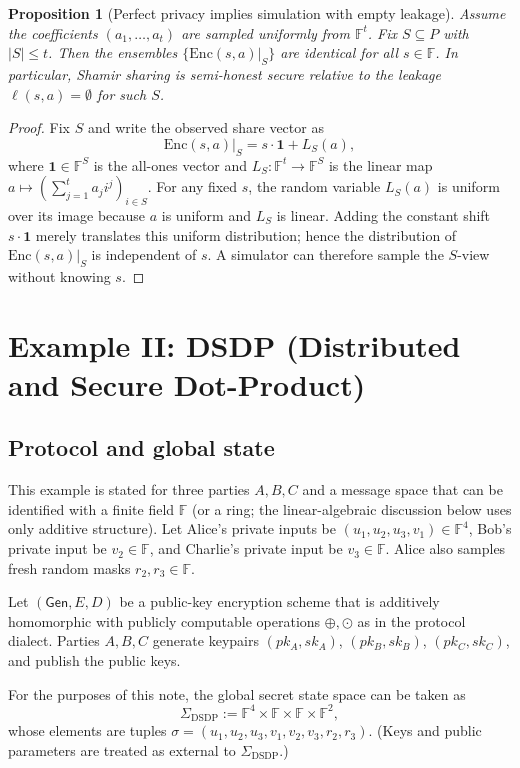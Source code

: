 \documentclass[11pt,a4paper]{article}
\newtheorem{proposition}[theorem]{Proposition}
\theoremstyle{definition}
\theoremstyle{remark}
\newcommand{\Parties}{P}
\newcommand{\F}{\mathbb{F}}
\newcommand{\Enc}{\mathrm{Enc}}
\newcommand{\headd}{\mathbin{\oplus}}
\newcommand{\hesmul}{\mathbin{\odot}}
\begin{document}
\begin{proposition}[Perfect privacy implies simulation with empty leakage]
\label{prop:shamir-perfect-privacy}
Assume the coefficients \((a_1,\dots,a_t)\) are sampled uniformly from \(\F^t\). Fix \(S\subseteq \Parties\) with \(|S|\le t\). Then the ensembles \(\{\Enc(s,a)\vert_S\}\) are identical for all \(s\in\F\). In particular, Shamir sharing is semi-honest secure relative to the leakage \(\ell(s,a)=\emptyset\) for such \(S\).
\end{proposition}

\begin{proof}
Fix \(S\) and write the observed share vector as
\[
\Enc(s,a)\vert_S = s\cdot \mathbf{1} + L_S(a),
\]
where \(\mathbf{1}\in\F^S\) is the all-ones vector and \(L_S:\F^t\to \F^S\) is the linear map \(a\mapsto ( \sum_{j=1}^t a_j i^j )_{i\in S}\). For any fixed \(s\), the random variable \(L_S(a)\) is uniform over its image because \(a\) is uniform and \(L_S\) is linear. Adding the constant shift \(s\cdot \mathbf{1}\) merely translates this uniform distribution; hence the distribution of \(\Enc(s,a)\vert_S\) is independent of \(s\). A simulator can therefore sample the \(S\)-view without knowing \(s\).
\end{proof}

\section{Example II: DSDP (Distributed and Secure Dot-Product)}
\label{sec:dsdp}

\subsection{Protocol and global state}
This example is stated for three parties \(A,B,C\) and a message space that can be identified with a finite field \(\F\) (or a ring; the linear-algebraic discussion below uses only additive structure). Let Alice's private inputs be \((u_1,u_2,u_3,v_1)\in \F^4\), Bob's private input be \(v_2\in\F\), and Charlie's private input be \(v_3\in\F\). Alice also samples fresh random masks \(r_2,r_3\in\F\).

Let \((\mathsf{Gen},E,D)\) be a public-key encryption scheme that is additively homomorphic with publicly computable operations \(\headd,\hesmul\) as in the protocol dialect. Parties \(A,B,C\) generate keypairs \((pk_A,sk_A)\), \((pk_B,sk_B)\), \((pk_C,sk_C)\), and publish the public keys.

For the purposes of this note, the global secret state space can be taken as
\[
\Sigma_{\mathrm{DSDP}} := \F^4 \times \F \times \F \times \F^2,
\]
whose elements are tuples \(\sigma=(u_1,u_2,u_3,v_1,v_2,v_3,r_2,r_3)\). (Keys and public parameters are treated as external to \(\Sigma_{\mathrm{DSDP}}\).)
\end{document}
